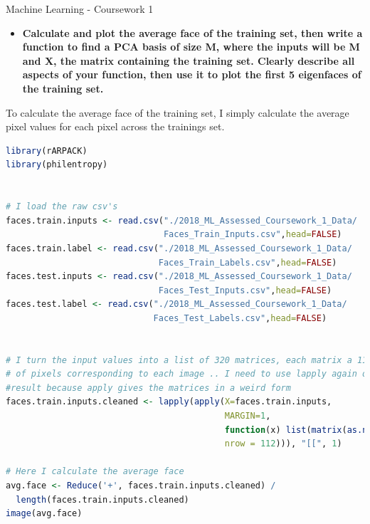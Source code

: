 \documentclass[12pt]{article}
\begin{document}
\pagestyle{fancyplain}
\cfoot{}{}


\begin{center} \Large
Machine Learning - Coursework 1 \\[4mm]
\end{center}

\par \hfill\hrulefill\hfill \vspace{2mm}


\vspace{0.3in}

\begin{itemize}
\item \textbf{Calculate and plot the average face of the training set, then write a function to find a PCA basis of size M, where the inputs will be M and X, the matrix containing the training set. Clearly describe all aspects of your function, then use it to plot the first 5 eigenfaces of the training set.}
\end{itemize}

To calculate the average face of the training set, I simply calculate the average pixel values for each pixel across the trainings set.

\begin{lstlisting}[linewidth=18.4cm,language=R]
library(rARPACK)
library(philentropy)


# I load the raw csv's
faces.train.inputs <- read.csv("./2018_ML_Assessed_Coursework_1_Data/
                               Faces_Train_Inputs.csv",head=FALSE)
faces.train.label <- read.csv("./2018_ML_Assessed_Coursework_1_Data/
                              Faces_Train_Labels.csv",head=FALSE)
faces.test.inputs <- read.csv("./2018_ML_Assessed_Coursework_1_Data/
                              Faces_Test_Inputs.csv",head=FALSE)
faces.test.label <- read.csv("./2018_ML_Assessed_Coursework_1_Data/
                             Faces_Test_Labels.csv",head=FALSE)


# I turn the input values into a list of 320 matrices, each matrix a 112 x 92 value 
# of pixels corresponding to each image .. I need to use lapply again on the 
#result because apply gives the matrices in a weird form
faces.train.inputs.cleaned <- lapply(apply(X=faces.train.inputs, 
                                           MARGIN=1, 
                                           function(x) list(matrix(as.numeric(x), 
                                           nrow = 112))), "[[", 1)

# Here I calculate the average face
avg.face <- Reduce('+', faces.train.inputs.cleaned) / 
  length(faces.train.inputs.cleaned)
image(avg.face)
\end{lstlisting}
\end{document}
